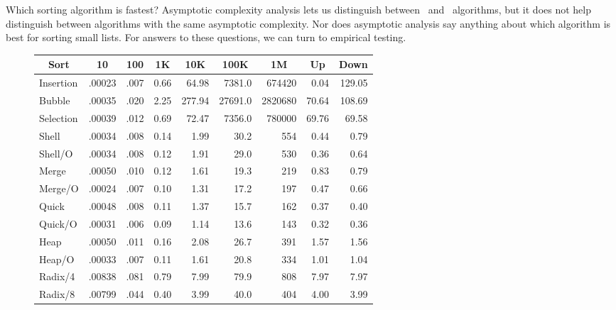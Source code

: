 Which sorting algorithm is fastest?  Asymptotic complexity analysis
lets us distinguish between \Thetantwo\ and \Thetanlogn\ algorithms,
but it does not help distinguish between algorithms with the same
asymptotic complexity.
Nor does asymptotic analysis say anything about which algorithm is
best for sorting small lists.
For answers to these questions, we can turn to empirical testing.

\begin{figure}
{\footnotesize
\begin{center}
\sffamily
\begin{tabular}{l|rrrrrrrr}
\hline
\multicolumn{1}{c|}{\textbf{Sort}} & \multicolumn{1}{c}{\textbf{10}}&
\multicolumn{1}{c}{\textbf{100}} & \multicolumn{1}{c}{\textbf{1K}}&
\multicolumn{1}{c}{\textbf{10K}} & \multicolumn{1}{c}{\textbf{100K}}&
\multicolumn{1}{c}{\textbf{1M}}&
\multicolumn{1}{c}{\textbf{Up}} & \multicolumn{1}{c}{\textbf{Down}}\\
\hline
Insertion & .00023 & .007 & 0.66 &  64.98 &  7381.0 &  674420 &   0.04 & 129.05\\
Bubble    & .00035 & .020 & 2.25 & 277.94 & 27691.0 & 2820680 &  70.64 & 108.69\\
Selection & .00039 & .012 & 0.69 &  72.47 &  7356.0 &  780000 &  69.76 &  69.58\\
Shell     & .00034 & .008 & 0.14 &   1.99 &    30.2 &     554 &   0.44 &   0.79\\
Shell/O   & .00034 & .008 & 0.12 &   1.91 &    29.0 &     530 &   0.36 &   0.64\\
Merge     & .00050 & .010 & 0.12 &   1.61 &    19.3 &     219 &   0.83 &   0.79\\
Merge/O   & .00024 & .007 & 0.10 &   1.31 &    17.2 &     197 &   0.47 &   0.66\\
Quick     & .00048 & .008 & 0.11 &   1.37 &    15.7 &     162 &   0.37 &   0.40\\
Quick/O   & .00031 & .006 & 0.09 &   1.14 &    13.6 &     143 &   0.32 &   0.36\\
Heap      & .00050 & .011 & 0.16 &   2.08 &    26.7 &     391 &   1.57 &   1.56\\
Heap/O    & .00033 & .007 & 0.11 &   1.61 &    20.8 &     334 &   1.01 &   1.04\\
Radix/4   & .00838 & .081 & 0.79 &   7.99 &    79.9 &     808 &   7.97 &   7.97\\
Radix/8   & .00799 & .044 & 0.40 &   3.99 &    40.0 &     404 &   4.00 &   3.99\\
\hline
\end{tabular}
\end{center}
}


\end{figure}
